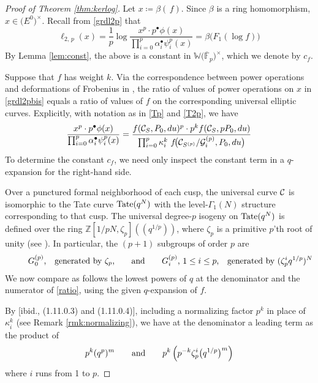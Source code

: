 \documentclass{gtpart}
\theoremstyle{definition}
\theoremstyle{remark}
\newcommand{\mb}[1]{\mathbb{#1}}
\newcommand{\cF}{\overline {\mb F}}
\newcommand{\CC}{{\cal C}}
\newcommand{\CG}{{\cal G}}
\newcommand{\BW}{{\mb W}}
\newcommand{\BZ}{{\mb Z}}
\newcommand{\ad}{{\rm and}}
\newcommand{\A}{\alpha}
\newcommand{\B}{\beta}
\newcommand{\G}{\Gamma}
\newcommand{\K}{\kappa}
\newcommand{\ce}{\coloneqq}
\newcommand{\lp}{(\!(}
\newcommand{\rp}{)\!)}
\renewcommand{\=}{\approx}
\renewcommand{\-}{\sim}
\newcommand{\Tate}{{\rm Tate}}
\numberwithin{equation}{section}
\numberwithin{thm}{section}
\begin{document}
\begin{proof}[Proof of Theorem \ref{thm:kerlog}]
 Let $x \ce \B(\,f)$.  Since $\B$ is a ring homomorphism, $x \in \big( E^0 \big)^{\!\times}$.  
 Recall from \eqref{grdl2p} that 
 \begin{equation}
  \label{grdl2pbis}
  \ell_{2,\,p}(x) = \frac{1}{p} \log \frac{x^p \cdot p^\bullet \phi(x)}{\prod_{i=0}^p \A_i^\bullet \psi^p_i(x)} = \B \big( F_1(\log f) \big) 
 \end{equation}
 By Lemma \ref{lem:const}, the above is a constant in $\BW \big( \cF_p \big)^{\!\times}$, which we denote by $c_f$.  

 Suppose that $f$ has weight $k$.  
 Via the correspondence between power operations and deformations of Frobenius in \cite[Theorem B]{cong}, 
 the ratio of values of power operations on $x$ in \eqref{grdl2pbis} 
 equals a ratio of values of $f$ on the corresponding universal elliptic curves.  
 Explicitly, with notation as in \eqref{Tp} and \eqref{T2p}, we have 
 \begin{equation}
  \label{ratio}
  \frac{x^p \cdot p^\bullet \phi(x)}{\prod_{i=0}^p \A_i^\bullet \psi^p_i(x)} = 
  \frac{f(\CC_S, P_0, du)^p \cdot p^k f(\CC_S, p P_0, du)}
  {\prod_{i=0}^p \K_i^k ~ f\!\big(\CC_{S^{(p)}}/\CG^{(p)}_i, P_0, du\big)} 
 \end{equation}
 To determine the constant $c_f$, we need only inspect the constant term in a $q$-expansion for the right-hand side.  

 Over a punctured formal neighborhood of each cusp, 
 the universal curve $\CC$ is isomorphic to the Tate curve $\Tate(q^N)$ with the level-$\G_1(N)$ structure corresponding to that cusp.  
 The universal degree-$p$ isogeny on $\Tate(q^N)$ is defined over the ring $\BZ [1/pN, \zeta_p] \lp q^{1/p} \rp$, 
 where $\zeta_p$ is a primitive $p$'th root of unity (see \cite[Sections 1.2, 1.4, and 1.11]{padicprop}).  
 In particular, the $(p + 1)$ subgroups of order $p$ are 
 \[
  \qquad~~ \text{$G^{(p)}_0$,~~~generated by $\zeta_p$,} \qquad \ad \qquad \text{$G^{(p)}_i$, $1 \leq i \leq p$,~~~generated by $(\zeta_p^i q^{1/p})^N$} 
 \]
 We now compare as follows the lowest powers of $q$ at the denominator and the numerator of \eqref{ratio}, 
 using the given $q$-expansion of $f$.  

 By [ibid., (1.11.0.3) and (1.11.0.4)], including a normalizing factor $p^k$ in place of $\K_i^k$ (see Remark \ref{rmk:normalizing}), 
 we have at the denominator a leading term as the product of 
 \[
  p^k (q^p)^m \qquad \ad \qquad p^k \left( p^{-k} \zeta_p^i \big( q^{1/p} \big)^m \right) 
 \]
 where $i$ runs from 1 to $p$.  


\end{proof}
\end{document}
